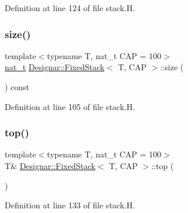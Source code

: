 Definition at line 124 of file stack.\+H.

\mbox{\label{class_designar_1_1_fixed_stack_a89fc7e6df53ecefa9197a63aeb17e1d0}} 
\subsubsection{\texorpdfstring{size()}{size()}}
{\footnotesize\ttfamily template$<$typename T, nat\+\_\+t C\+AP = 100$>$ \\
\hyperlink{namespace_designar_aa72662848b9f4815e7bf31a7cf3e33d1}{nat\+\_\+t} \hyperlink{class_designar_1_1_fixed_stack}{Designar\+::\+Fixed\+Stack}$<$ T, C\+AP $>$\+::size (\begin{DoxyParamCaption}{ }\end{DoxyParamCaption}) const\hspace{0.3cm}{\ttfamily [inline]}}



Definition at line 105 of file stack.\+H.

\mbox{\label{class_designar_1_1_fixed_stack_ad9ee2070f73351b57f5cb7de74ab6aa7}} 
\subsubsection{\texorpdfstring{top()}{top()}\hspace{0.1cm}{\footnotesize\ttfamily [1/2]}}
{\footnotesize\ttfamily template$<$typename T, nat\+\_\+t C\+AP = 100$>$ \\
T\& \hyperlink{class_designar_1_1_fixed_stack}{Designar\+::\+Fixed\+Stack}$<$ T, C\+AP $>$\+::top (\begin{DoxyParamCaption}{ }\end{DoxyParamCaption})\hspace{0.3cm}{\ttfamily [inline]}}



Definition at line 133 of file stack.\+H.

\mbox{\label{class_designar_1_1_fixed_stack_a02582f09d4935d315b28da7ae93db0b3}} 
